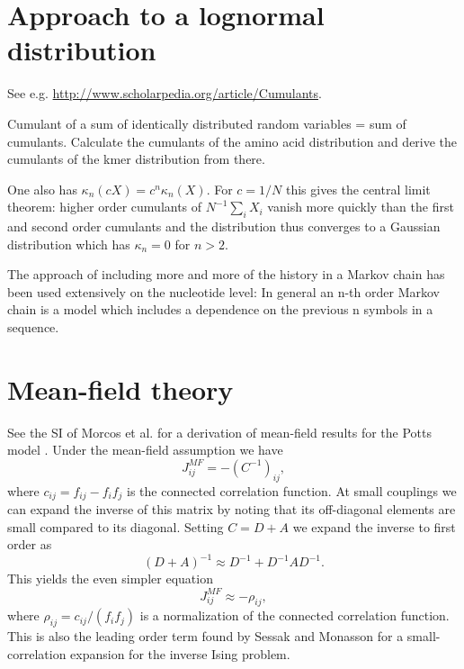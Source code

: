 \documentclass[superscriptaddress,onecolumn,pre]{revtex4}
\newcommand{\<}{\langle}
\renewcommand{\>}{\rangle}
\begin{document}
\section{Approach to a lognormal distribution}

See e.g. \url{http://www.scholarpedia.org/article/Cumulants}.

Cumulant of a sum of identically distributed random variables = sum of cumulants. Calculate the cumulants of the amino acid distribution and derive the cumulants of the kmer distribution from there.

One also has $\kappa_n(c X) = c^n \kappa_n(X)$. For $c = 1/N$ this gives the central limit theorem: higher order cumulants of $N^{-1} \sum_i X_i$ vanish more quickly than the first and second order cumulants and the distribution thus converges to a Gaussian distribution which has $\kappa_n = 0$ for $n>2$.

The approach of including more and more of the history in a Markov chain has been used extensively on the nucleotide level: In general an n-th order Markov chain is a model which includes a dependence on the previous n symbols in a sequence.

\section{Mean-field theory}

See the SI of Morcos et al. for a derivation of mean-field results for the Potts model \cite{Morcos2011}. Under the mean-field assumption we have 
\begin{equation}
    J_{ij}^{MF} = - (C^{-1})_{ij}, 
\end{equation}
where $c_{ij} = f_{ij} - f_i f_j$ is the connected correlation function. At small couplings we can expand the inverse of this matrix by noting that its off-diagonal elements are small compared to its diagonal. Setting $C = D + A$ we expand the inverse to first order as
\begin{equation}
    (D+A)^{-1} \approx D^{-1} + D^{-1} A D^{-1}. 
\end{equation}
This yields the even simpler equation
\begin{equation}
    J_{ij}^{MF} \approx - \rho_{ij},
\end{equation}
where $\rho_{ij} = c_{ij}/(f_i f_j)$ is a normalization of the connected correlation function. This is also the leading order term found by Sessak and Monasson for a small-correlation expansion for the inverse Ising problem.


\end{document}
